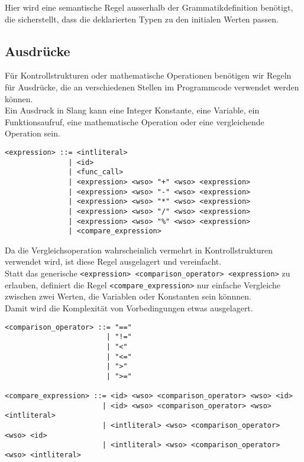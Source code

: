 Hier wird eine semantische Regel ausserhalb der Grammatikdefinition benötigt, die sicherstellt, dass die deklarierten Typen zu den initialen Werten passen.\\

\subsection{Ausdrücke}

Für Kontrollstrukturen oder mathematische Operationen benötigen wir Regeln für Ausdrücke, die an verschiedenen Stellen im Programmcode verwendet werden können.\\
Ein Ausdruck in Slang kann eine Integer Konstante, eine Variable, ein Funktionsaufruf, eine mathematische Operation oder eine vergleichende Operation sein.\\

\begin{lstlisting}
<expression> ::= <intliteral>
               | <id>
               | <func_call>
               | <expression> <wso> "+" <wso> <expression>
               | <expression> <wso> "-" <wso> <expression>
               | <expression> <wso> "*" <wso> <expression>
               | <expression> <wso> "/" <wso> <expression>
               | <expression> <wso> "%" <wso> <expression>
               | <compare_expression>
\end{lstlisting}

Da die Vergleichsoperation wahrscheinlich vermehrt in Kontrollstrukturen verwendet wird, ist diese Regel ausgelagert und vereinfacht.\\
Statt das generische \texttt{<expression> <comparison\_operator> <expression>} zu erlauben, definiert die Regel \texttt{<compare\_expression>} nur einfache Vergleiche zwischen zwei Werten, die Variablen  oder Konstanten sein könnnen.\\
Damit wird die Komplexität von Vorbedingungen etwas ausgelagert.\\

\begin{lstlisting}
<comparison_operator> ::= "=="
                        | "!="
                        | "<"
                        | "<="
                        | ">"
                        | ">="

<compare_expression> ::= <id> <wso> <comparison_operator> <wso> <id>
                       | <id> <wso> <comparison_operator> <wso> <intliteral>
                       | <intliteral> <wso> <comparison_operator> <wso> <id>
                       | <intliteral> <wso> <comparison_operator> <wso> <intliteral>
\end{lstlisting}


